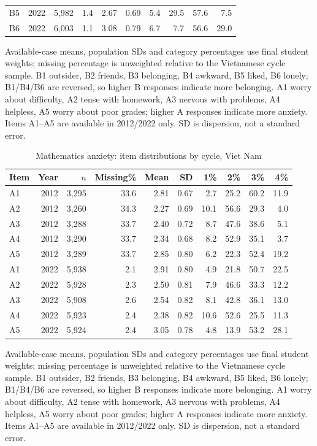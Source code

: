 \begin{table}[H]
\begin{tabular}{@{}lrrrrrrrrr@{}}
B5 & 2022 & 5,982 & 1.4 & 2.67 & 0.69 & 5.4 & 29.5 & 57.6 & 7.5\\
B6 & 2022 & 6,003 & 1.1 & 3.08 & 0.79 & 6.7 & 7.7 & 56.6 & 29.0\\
\bottomrule
\end{tabular}
\par\smallskip\raggedright\footnotesize Available-case means, population SDs and category percentages use final student weights; missing percentage is unweighted relative to the Vietnamese cycle sample. B1 outsider, B2 friends, B3 belonging, B4 awkward, B5 liked, B6 lonely; B1/B4/B6 are reversed, so higher B responses indicate more belonging. A1 worry about difficulty, A2 tense with homework, A3 nervous with problems, A4 helpless, A5 worry about poor grades; higher A responses indicate more anxiety. Items A1--A5 are available in 2012/2022 only. SD is dispersion, not a standard error.
\end{table}

\begin{table}[H]\centering\scriptsize
\caption{Mathematics anxiety: item distributions by cycle, Viet Nam}\label{tab:itemsA}
\begin{tabular}{@{}lrrrrrrrrr@{}}
\toprule
Item & Year & $n$ & Missing\% & Mean & SD & 1\% & 2\% & 3\% & 4\%\\
\midrule
A1 & 2012 & 3,295 & 33.6 & 2.81 & 0.67 & 2.7 & 25.2 & 60.2 & 11.9\\
A2 & 2012 & 3,260 & 34.3 & 2.27 & 0.69 & 10.1 & 56.6 & 29.3 & 4.0\\
A3 & 2012 & 3,288 & 33.7 & 2.40 & 0.72 & 8.7 & 47.6 & 38.6 & 5.1\\
A4 & 2012 & 3,290 & 33.7 & 2.34 & 0.68 & 8.2 & 52.9 & 35.1 & 3.7\\
A5 & 2012 & 3,289 & 33.7 & 2.85 & 0.80 & 6.2 & 22.3 & 52.4 & 19.2\\
A1 & 2022 & 5,938 & 2.1 & 2.91 & 0.80 & 4.9 & 21.8 & 50.7 & 22.5\\
A2 & 2022 & 5,928 & 2.3 & 2.50 & 0.81 & 7.9 & 46.6 & 33.3 & 12.2\\
A3 & 2022 & 5,908 & 2.6 & 2.54 & 0.82 & 8.1 & 42.8 & 36.1 & 13.0\\
A4 & 2022 & 5,923 & 2.4 & 2.38 & 0.82 & 10.6 & 52.6 & 25.5 & 11.3\\
A5 & 2022 & 5,924 & 2.4 & 3.05 & 0.78 & 4.8 & 13.9 & 53.2 & 28.1\\
\bottomrule
\end{tabular}
\par\smallskip\raggedright\footnotesize Available-case means, population SDs and category percentages use final student weights; missing percentage is unweighted relative to the Vietnamese cycle sample. B1 outsider, B2 friends, B3 belonging, B4 awkward, B5 liked, B6 lonely; B1/B4/B6 are reversed, so higher B responses indicate more belonging. A1 worry about difficulty, A2 tense with homework, A3 nervous with problems, A4 helpless, A5 worry about poor grades; higher A responses indicate more anxiety. Items A1--A5 are available in 2012/2022 only. SD is dispersion, not a standard error.
\end{table}

